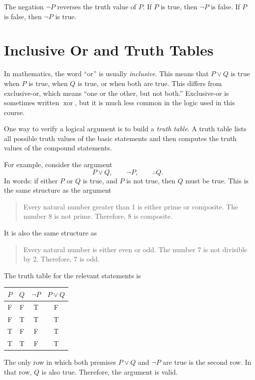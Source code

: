 \label{mf:logic-negation}
The negation \(\neg P\) reverses the truth value of \(P\). If \(P\) is true, then \(\neg P\) is false. If \(P\) is false, then \(\neg P\) is true.

\section{Inclusive Or and Truth Tables}
\label{mf:logic-truth-tables}

In mathematics, the word ``or'' is usually \emph{inclusive}. This means that \(P \lor Q\) is true when \(P\) is true, when \(Q\) is true, or when both are true. This differs from exclusive-or, which means ``one or the other, but not both.'' Exclusive-or is sometimes written \(\operatorname{xor}\), but it is much less common in the logic used in this course.

One way to verify a logical argument is to build a \emph{truth table}. A truth table lists all possible truth values of the basic statements and then computes the truth values of the compound statements.

For example, consider the argument
\[
P \lor Q,
\qquad
\neg P,
\qquad
\therefore Q.
\]
In words: if either \(P\) or \(Q\) is true, and \(P\) is not true, then \(Q\) must be true. This is the same structure as the argument
\begin{quote}
Every natural number greater than 1 is either prime or composite. The number 8 is not prime. Therefore, 8 is composite.
\end{quote}
It is also the same structure as
\begin{quote}
Every natural number is either even or odd. The number 7 is not divisible by 2. Therefore, 7 is odd.
\end{quote}

The truth table for the relevant statements is
\begin{center}
\begin{tabular}{c c c c}
\hline
\(P\) & \(Q\) & \(\neg P\) & \(P \lor Q\) \\
\hline
F & F & T & F \\
F & T & T & T \\
T & F & F & T \\
T & T & F & T \\
\hline
\end{tabular}
\end{center}
The only row in which both premises \(P \lor Q\) and \(\neg P\) are true is the second row. In that row, \(Q\) is also true. Therefore, the argument is valid.

